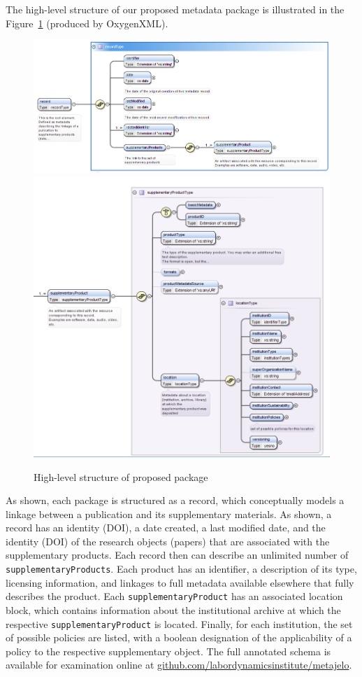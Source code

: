 The high-level structure of our proposed metadata package is illustrated in the Figure~\ref{fig:schema_v1} (produced by OxygenXML). 
\begin{figure}
	\includegraphics[width=\textwidth]{images/Selection_447.png}
	\includegraphics[width=\textwidth]{images/reproMetadata0.7_schema.part2.png}
	\caption{\label{fig:schema_v1}High-level structure of proposed package}
\end{figure} 
As shown, each package is structured as a record, which conceptually models a linkage between a publication and its supplementary materials.  As shown, a record has an identity (\ac{DOI}), a date created, a last modified date, and the identity (\ac{DOI}) of the research objects (papers) that are associated with the supplementary products.
Each record then can describe an unlimited number of \texttt{supplementaryProducts}.  Each product has an identifier, a description of its type, licensing information, and linkages to full metadata available elsewhere that fully describes the product.  Each \texttt{supplementaryProduct} has an associated location block, which contains information about the institutional archive at which the respective \texttt{supplementaryProduct} is located.  Finally, for each institution, the set of possible policies are listed, with a boolean designation of the applicability of a policy to the respective supplementary object.   
The full annotated schema is available for examination online at \href{https://github.com/labordynamicsinstitute/metajelo}{github.com/labordynamicsinstitute/metajelo}.

